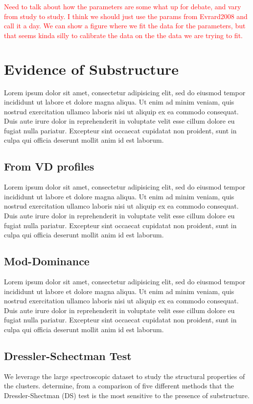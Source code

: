 \documentclass[apj, revtex4]{emulateapj}
\newcommand{\editorial}[1]{\textcolor{red}{#1} }
\begin{document}
\editorial{Need to talk about how the parameters are some what up for debate, and vary from study to study. I think we should just use the params from Evrard2008 and call it a day. We can show a figure where we fit the data for the parameters, but that seems kinda silly to calibrate the data on the the data we are trying to fit.}


\section{Evidence of Substructure}
Lorem ipsum dolor sit amet, consectetur adipisicing elit, sed do eiusmod tempor incididunt ut labore et dolore magna aliqua. Ut enim ad minim veniam, quis nostrud exercitation ullamco laboris nisi ut aliquip ex ea commodo consequat. Duis aute irure dolor in reprehenderit in voluptate velit esse cillum dolore eu fugiat nulla pariatur. Excepteur sint occaecat cupidatat non proident, sunt in culpa qui officia deserunt mollit anim id est laborum.
\subsection{From VD profiles}
Lorem ipsum dolor sit amet, consectetur adipisicing elit, sed do eiusmod tempor incididunt ut labore et dolore magna aliqua. Ut enim ad minim veniam, quis nostrud exercitation ullamco laboris nisi ut aliquip ex ea commodo consequat. Duis aute irure dolor in reprehenderit in voluptate velit esse cillum dolore eu fugiat nulla pariatur. Excepteur sint occaecat cupidatat non proident, sunt in culpa qui officia deserunt mollit anim id est laborum.
\subsection{Mod-Dominance}
Lorem ipsum dolor sit amet, consectetur adipisicing elit, sed do eiusmod tempor incididunt ut labore et dolore magna aliqua. Ut enim ad minim veniam, quis nostrud exercitation ullamco laboris nisi ut aliquip ex ea commodo consequat. Duis aute irure dolor in reprehenderit in voluptate velit esse cillum dolore eu fugiat nulla pariatur. Excepteur sint occaecat cupidatat non proident, sunt in culpa qui officia deserunt mollit anim id est laborum.
\subsection{Dressler-Schectman Test}
We leverage the large spectroscopic dataset to study the structural properties of the clusters. \cite{Pinkney1996} determine, from a comparison of five different methods that the Dressler-Shectman (DS) test \citep{Dressler1988} is the most sensitive to the presence of substructure.
\end{document}
